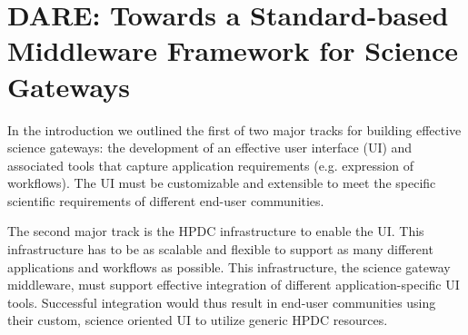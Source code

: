 \documentclass[]{svjour3}
\begin{document}







\section{DARE: Towards a Standard-based Middleware Framework for
  Science Gateways}



In the introduction we outlined the first of two major tracks for
building effective science gateways: the development of an effective
user interface (UI) and associated tools that capture application
requirements (e.g. expression of workflows).  The UI must be
customizable and extensible to meet the specific scientific
requirements of different end-user communities.

The second major track is the HPDC infrastructure to enable the
UI. This infrastructure has to be as scalable and flexible to support
as many different applications and workflows as possible. This
infrastructure, the science gateway middleware, must support effective
integration of different application-specific UI tools. Successful
integration would thus result in end-user communities using their
custom, science oriented UI to utilize generic HPDC resources.
\end{document}
